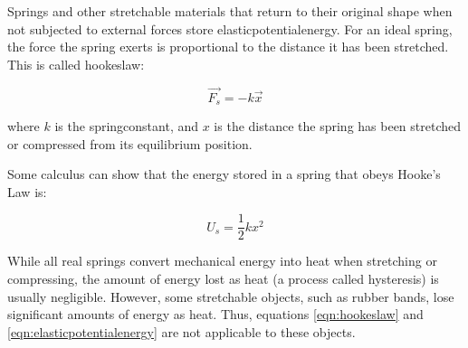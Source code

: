 	Springs and other stretchable materials that return to their original shape when not subjected to external forces store \gls{elasticpotentialenergy}.  For an ideal spring, the force the spring exerts is proportional to the distance it has been stretched.  This is called \gls{hookeslaw}: 
	
		\begin{mdframed}[backgroundcolor=orange!20!white]
		\begin{equation}
		\overrightarrow{F_s} = -k\vec{x}
		\label{eqn:hookeslaw}
		\end{equation}
	\end{mdframed}
	where $k$ is the \gls{springconstant},   and $x$ is the distance the spring has been stretched or compressed from its equilibrium position.
	
	Some calculus can show that the energy stored in a spring that obeys Hooke's Law is: 
	
	\begin{mdframed}[backgroundcolor=orange!20!white]
		\begin{equation}
		U_s = \frac{1}{2}kx^2
		\label{eqn:elasticpotentialenergy}
		\end{equation}
	\end{mdframed}

	While all real springs convert mechanical energy into heat when stretching or compressing, the amount of energy lost as heat (a process called hysteresis) is usually negligible.  However, some stretchable objects, such as rubber bands, lose significant amounts of energy as heat.  Thus, equations \ref{eqn:hookeslaw} and \ref{eqn:elasticpotentialenergy} are not applicable to these objects.  
	
	
		
